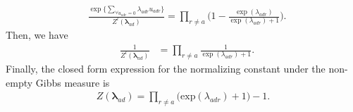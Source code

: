 \documentclass[12pt]{article}
\begin{document}
\begin{appendices}
\begin{equation*}
\begin{aligned}
&\frac{\exp\Big\{ \sum\limits_{\forall u_{adr}=0}\lambda_{adr}u_{adr} \Big\}}{Z^{l}(\boldsymbol{\lambda}_{ad})}= \prod_{r \neq a}   \Big(1-\frac{ \exp{(\lambda_{adr})}}{\exp{(\lambda_{adr})} + 1}\Big).
\end{aligned}  
\end{equation*}
Then, we have 
\begin{equation*}
\begin{aligned}
& \frac{1}{Z^{l}(\boldsymbol{\lambda}_{ad})} &= \prod\limits_{r \neq a}\frac{1}{ \exp(\lambda_{adr})+ 1}.
\end{aligned}  
\end{equation*}
Finally, the closed form expression for the normalizing constant under the non-empty Gibbs measure is  \begin{equation*}
\begin{aligned}Z(\boldsymbol{\lambda}_{ad}) = \prod_{r \neq a } \big(\mbox{exp}(\lambda_{adr}) + 1\big)-1.
\end{aligned}  
\end{equation*}
 
	\end{appendices}
\end{document}

